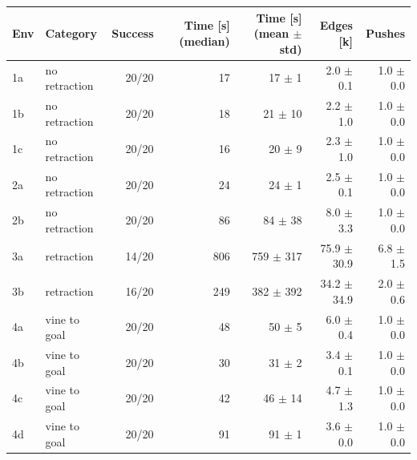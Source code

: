 \begin{tabular}{llrrrrr}
\toprule
Env & Category & Success & Time [s] (median) & Time [s] (mean $\pm$ std) & Edges [k] & Pushes \\
\midrule
1a & no retraction & 20/20 & 17 & 17 $\pm$ 1 & 2.0 $\pm$ 0.1 & 1.0 $\pm$ 0.0 \\
1b & no retraction & 20/20 & 18 & 21 $\pm$ 10 & 2.2 $\pm$ 1.0 & 1.0 $\pm$ 0.0 \\
1c & no retraction & 20/20 & 16 & 20 $\pm$ 9 & 2.3 $\pm$ 1.0 & 1.0 $\pm$ 0.0 \\
2a & no retraction & 20/20 & 24 & 24 $\pm$ 1 & 2.5 $\pm$ 0.1 & 1.0 $\pm$ 0.0 \\
2b & no retraction & 20/20 & 86 & 84 $\pm$ 38 & 8.0 $\pm$ 3.3 & 1.0 $\pm$ 0.0 \\
3a & retraction & 14/20 & 806 & 759 $\pm$ 317 & 75.9 $\pm$ 30.9 & 6.8 $\pm$ 1.5 \\
3b & retraction & 16/20 & 249 & 382 $\pm$ 392 & 34.2 $\pm$ 34.9 & 2.0 $\pm$ 0.6 \\
4a & vine to goal & 20/20 & 48 & 50 $\pm$ 5 & 6.0 $\pm$ 0.4 & 1.0 $\pm$ 0.0 \\
4b & vine to goal & 20/20 & 30 & 31 $\pm$ 2 & 3.4 $\pm$ 0.1 & 1.0 $\pm$ 0.0 \\
4c & vine to goal & 20/20 & 42 & 46 $\pm$ 14 & 4.7 $\pm$ 1.3 & 1.0 $\pm$ 0.0 \\
4d & vine to goal & 20/20 & 91 & 91 $\pm$ 1 & 3.6 $\pm$ 0.0 & 1.0 $\pm$ 0.0 \\
\bottomrule
\end{tabular}
